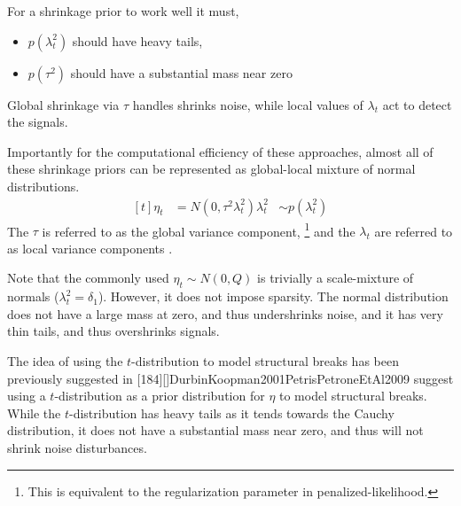 \documentclass{article}
\begin{document}
For a shrinkage prior to work well it must,\parencite[5]{PolsonScott2010}
\begin{itemize}
\item $p(\lambda_{t}^{2})$ should have heavy tails,
\item $p(\tau^{2})$ should have a substantial mass near zero
\end{itemize}
Global shrinkage via $\tau$ handles shrinks noise, while local values of $\lambda_{t}$ act to detect the signals.\parencite[5]{PolsonScott2010}

Importantly for the computational efficiency of these approaches, almost all of these shrinkage priors can be represented as global-local mixture of normal distributions.
\begin{equation}
  \label{eq:3}
  \begin{aligned}[t]
    \eta_{t} &= N(0, \tau^{2} \lambda_{t}^{2})
    \lambda_{t}^{2} &\sim p(\lambda_{t}^{2})
  \end{aligned}
\end{equation}
The $\tau$ is referred to as the global variance component,%
\footnote{This is equivalent to the regularization parameter in penalized-likelihood.}
and the $\lambda_{t}$ are referred to as local variance components \parencite{PolsonScott2010}.

Note that the commonly used $\eta_{t} \sim N(0, Q)$ is trivially a scale-mixture of normals ($\lambda_{t}^{2} = \delta_{1}$).
However, it does not impose sparsity. 
The normal distribution does not have a large mass at zero, and thus undershrinks noise, and it has very thin tails, and thus overshrinks signals.

The idea of using the $t$-distribution to model structural breaks has been previously suggested in \textcite{HarveyKoopman2000}[184][]{DurbinKoopman2001}{PetrisPetroneEtAl2009} suggest using a $t$-distribution as a prior distribution for $\eta$ to model structural breaks.
While the $t$-distribution has heavy tails as it tends towards the Cauchy distribution, it does not have a substantial mass near zero, and thus will not shrink noise disturbances.
\end{document}
